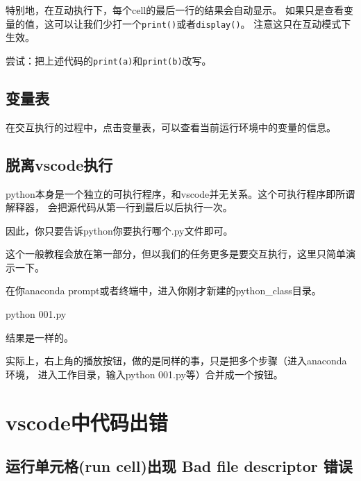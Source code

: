 \documentclass[
  letterpaper,
  DIV=11,
  numbers=noendperiod]{scrreprt}
\newenvironment{Shaded}{\begin{snugshade}}{\end{snugshade}}
\newcommand{\ErrorTok}[1]{\textcolor[rgb]{0.68,0.00,0.00}{#1}}
\newcommand{\FloatTok}[1]{\textcolor[rgb]{0.68,0.00,0.00}{#1}}
\newcommand{\NormalTok}[1]{\textcolor[rgb]{0.00,0.23,0.31}{#1}}
\begin{document}
特别地，在互动执行下，每个cell的最后一行的结果会自动显示。
如果只是查看变量的值，这可以让我们少打一个\texttt{print()}或者\texttt{display()}。
注意这只在互动模式下生效。

尝试：把上述代码的\texttt{print(a)}和\texttt{print(b)}改写。

\hypertarget{ux53d8ux91cfux8868}{%
\subsection{变量表}\label{ux53d8ux91cfux8868}}

在交互执行的过程中，点击变量表，可以查看当前运行环境中的变量的信息。

\hypertarget{ux8131ux79bbvscodeux6267ux884c}{%
\subsection{脱离vscode执行}\label{ux8131ux79bbvscodeux6267ux884c}}

python本身是一个独立的可执行程序，和vscode并无关系。这个可执行程序即所谓解释器，
会把源代码从第一行到最后以后执行一次。

因此，你只要告诉python你要执行哪个.py文件即可。

这个一般教程会放在第一部分，但以我们的任务更多是要交互执行，这里只简单演示一下。

在你anaconda prompt或者终端中，进入你刚才新建的python\_class目录。

\begin{Shaded}
\begin{Highlighting}[]
\NormalTok{python }\FloatTok{001.}\ErrorTok{py}
\end{Highlighting}
\end{Shaded}

结果是一样的。

实际上，右上角的播放按钮，做的是同样的事，只是把多个步骤（进入anaconda环境，
进入工作目录，输入python 001.py等）合并成一个按钮。

\hypertarget{vscodeux4e2dux4ee3ux7801ux51faux9519}{%
\section{vscode中代码出错}\label{vscodeux4e2dux4ee3ux7801ux51faux9519}}

\hypertarget{ux8fd0ux884cux5355ux5143ux683crun-cellux51faux73b0-bad-file-descriptor-ux9519ux8bef}{%
\subsection{运行单元格(run cell)出现 Bad file descriptor
错误}\label{ux8fd0ux884cux5355ux5143ux683crun-cellux51faux73b0-bad-file-descriptor-ux9519ux8bef}}
\end{document}

